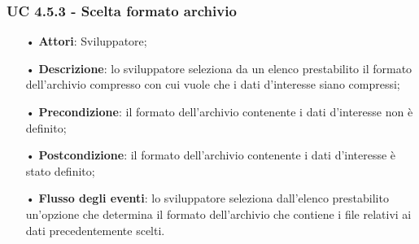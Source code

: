 \subsubsection{UC 4.5.3 - Scelta formato archivio}
\begin{itemize}
	\item[•]\textbf{Attori}: Sviluppatore;
	\item[•]\textbf{Descrizione}: lo sviluppatore seleziona da un elenco prestabilito il formato dell'archivio compresso con cui vuole che i dati d'interesse siano compressi;
	\item[•]\textbf{Precondizione}: il formato dell'archivio contenente i dati d'interesse non è definito;
	\item[•]\textbf{Postcondizione}: il formato dell'archivio contenente i dati d'interesse è stato definito;
	\item[•]\textbf{Flusso degli eventi}: lo sviluppatore seleziona dall'elenco prestabilito un'opzione che determina il formato dell'archivio che contiene i file relativi ai dati precedentemente scelti.
\end{itemize}


